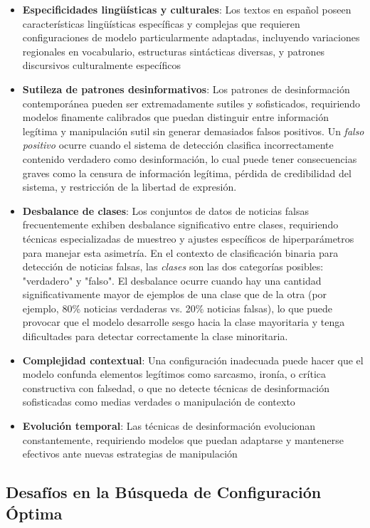 \begin{itemize}
    \item \textbf{Especificidades lingüísticas y culturales}: Los textos en español poseen características lingüísticas específicas y complejas que requieren configuraciones de modelo particularmente adaptadas, incluyendo variaciones regionales en vocabulario, estructuras sintácticas diversas, y patrones discursivos culturalmente específicos
    \item \textbf{Sutileza de patrones desinformativos}: Los patrones de desinformación contemporánea pueden ser extremadamente sutiles y sofisticados, requiriendo modelos finamente calibrados que puedan distinguir entre información legítima y manipulación sutil sin generar demasiados falsos positivos. Un \textit{falso positivo} ocurre cuando el sistema de detección clasifica incorrectamente contenido verdadero como desinformación, lo cual puede tener consecuencias graves como la censura de información legítima, pérdida de credibilidad del sistema, y restricción de la libertad de expresión.
    \item \textbf{Desbalance de clases}: Los conjuntos de datos de noticias falsas frecuentemente exhiben desbalance significativo entre clases, requiriendo técnicas especializadas de muestreo y ajustes específicos de hiperparámetros para manejar esta asimetría. En el contexto de clasificación binaria para detección de noticias falsas, las \textit{clases} son las dos categorías posibles: "verdadero" y "falso". El desbalance ocurre cuando hay una cantidad significativamente mayor de ejemplos de una clase que de la otra (por ejemplo, 80\% noticias verdaderas vs. 20\% noticias falsas), lo que puede provocar que el modelo desarrolle sesgo hacia la clase mayoritaria y tenga dificultades para detectar correctamente la clase minoritaria.
    \item \textbf{Complejidad contextual}: Una configuración inadecuada puede hacer que el modelo confunda elementos legítimos como sarcasmo, ironía, o crítica constructiva con falsedad, o que no detecte técnicas de desinformación sofisticadas como medias verdades o manipulación de contexto
    \item \textbf{Evolución temporal}: Las técnicas de desinformación evolucionan constantemente, requiriendo modelos que puedan adaptarse y mantenerse efectivos ante nuevas estrategias de manipulación
\end{itemize}

\subsection{Desafíos en la Búsqueda de Configuración Óptima}

